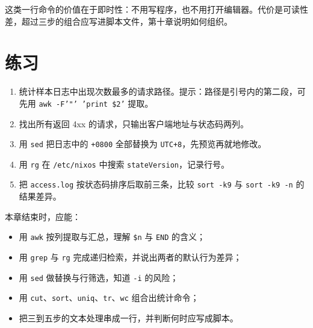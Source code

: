 这类一行命令的价值在于即时性：不用写程序，也不用打开编辑器。代价是可读性差，超过三步的组合应写进脚本文件，第十章说明如何组织。

\section{练习}

\begin{enumerate}
  \item 统计样本日志中出现次数最多的请求路径。提示：路径是引号内的第二段，可先用 \texttt{awk -F'"' '{print \$2}'} 提取。
  \item 找出所有返回 4xx 的请求，只输出客户端地址与状态码两列。
  \item 用 \texttt{sed} 把日志中的 \texttt{+0800} 全部替换为 \texttt{UTC+8}，先预览再就地修改。
  \item 用 \texttt{rg} 在 \texttt{/etc/nixos} 中搜索 \texttt{stateVersion}，记录行号。
  \item 把 \texttt{access.log} 按状态码排序后取前三条，比较 \texttt{sort -k9} 与 \texttt{sort -k9 -n} 的结果差异。
\end{enumerate}

\begin{checkpoint}
本章结束时，应能：
\begin{itemize}
  \item 用 \texttt{awk} 按列提取与汇总，理解 \texttt{\$n} 与 \texttt{END} 的含义；
  \item 用 \texttt{grep} 与 \texttt{rg} 完成递归检索，并说出两者的默认行为差异；
  \item 用 \texttt{sed} 做替换与行筛选，知道 \texttt{-i} 的风险；
  \item 用 \texttt{cut}、\texttt{sort}、\texttt{uniq}、\texttt{tr}、\texttt{wc} 组合出统计命令；
  \item 把三到五步的文本处理串成一行，并判断何时应写成脚本。
\end{itemize}
\end{checkpoint}
